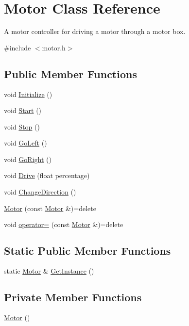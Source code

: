 \hypertarget{class_motor}{}\section{Motor Class Reference}
\label{class_motor}


A motor controller for driving a motor through a motor box.  




{\ttfamily \#include $<$motor.\+h$>$}

\subsection*{Public Member Functions}
\begin{DoxyCompactItemize}
\item 
void \hyperlink{class_motor_afa5bb4104353e750563252099b6261ca}{Initialize} ()
\item 
void \hyperlink{class_motor_a4c449b886767bb6f76c3197fd7d072c3}{Start} ()
\item 
void \hyperlink{class_motor_a8f0fdb6c977ea11e89281c51534850ca}{Stop} ()
\item 
void \hyperlink{class_motor_accc1f6815534eb7e7d694dce8d7be3a9}{Go\+Left} ()
\item 
void \hyperlink{class_motor_aa7fc3ff7511fb88f3dff67587003ca2d}{Go\+Right} ()
\item 
void \hyperlink{class_motor_a653f0e6158ce2d44a1b1704c1787d74b}{Drive} (float percentage)
\item 
void \hyperlink{class_motor_a4b1fb35dcf10c3e17a1614877b9b6a7d}{Change\+Direction} ()
\item 
\hyperlink{class_motor_a52b11cfa6ffdd07dcb26c71a017142a1}{Motor} (const \hyperlink{class_motor}{Motor} \&)=delete
\item 
void \hyperlink{class_motor_afd01e338a159f04706f6a0b95e8e2bd9}{operator=} (const \hyperlink{class_motor}{Motor} \&)=delete
\end{DoxyCompactItemize}
\subsection*{Static Public Member Functions}
\begin{DoxyCompactItemize}
\item 
static \hyperlink{class_motor}{Motor} \& \hyperlink{class_motor_a20fcd40b6fd58d4894310fb3b0df9b7a}{Get\+Instance} ()
\end{DoxyCompactItemize}
\subsection*{Private Member Functions}
\begin{DoxyCompactItemize}
\item 
\hyperlink{class_motor_af6106b4c506411265c5face762b6c004}{Motor} ()
\end{DoxyCompactItemize}
